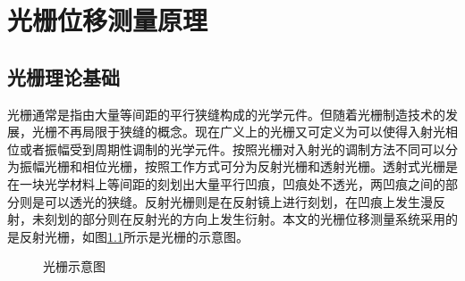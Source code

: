 \documentclass[type=master,oneside]{fduthesis}
\begin{document}
\chapter{光栅位移测量原理}
\section{光栅理论基础}
光栅\cite{石顺祥2000物理光学与应用光学,palmer2005diffraction}通常是指由大量等间距的平行狭缝构成的光学元件。但随着光栅制造技术的发展，光栅不再局限于狭缝的概念。现在广义上的光栅又可定义为可以使得入射光相位或者振幅受到周期性调制的光学元件。按照光栅对入射光的调制方法不同可以分为振幅光栅和相位光栅，按照工作方式可分为反射光栅和透射光栅。透射式光栅是在一块光学材料上等间距的刻划出大量平行凹痕，凹痕处不透光，两凹痕之间的部分则是可以透光的狭缝。反射光栅则是在反射镜上进行刻划，在凹痕上发生漫反射，未刻划的部分则在反射光的方向上发生衍射。本文的光栅位移测量系统采用的是反射光栅，如图\ref{fig:光栅示意图}所示是光栅的示意图。
\begin{figure}[H]
  \centering
  \caption{光栅示意图}
  \label{fig:光栅示意图}
\end{figure}
\end{document}
